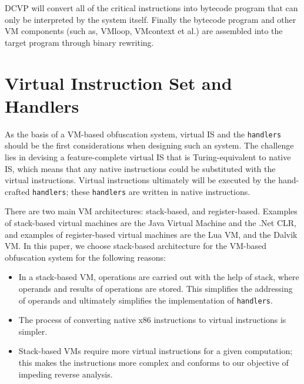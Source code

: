 DCVP will convert all of the critical instructions into bytecode program that can only be interpreted by the system itself. Finally the bytecode program and other VM components (such as, VMloop, VMcontext et al.) are assembled into the target program through binary rewriting.



\section{Virtual Instruction Set and Handlers}\label{sec:VIS-Handlers}
As the basis of a VM-based obfuscation system, virtual IS and the \texttt{handlers} should be the first considerations when designing such an system. The challenge lies in devising a feature-complete virtual IS that is Turing-equivalent to native IS, which means that any native instructions could be substituted with the virtual instructions. Virtual instructions ultimately will be executed by the hand-crafted \texttt{handlers}; these \texttt{handlers} are written in native instructions.

There are two main VM architectures: stack-based, and register-based. Examples of stack-based virtual machines are the Java Virtual Machine and the .Net CLR, and examples of register-based virtual machines are the Lua VM, and the Dalvik VM. In this paper, we choose stack-based architecture for the VM-based obfuscation system for the following reasons:
\begin{itemize}
  \item In a stack-based VM, operations are carried out with the help of stack, where operands and results of operations are stored. This simplifies the addressing of operands and ultimately simplifies the implementation of \texttt{handlers}.
  \item The process of converting native x86 instructions to virtual instructions is simpler.
  \item Stack-based VMs require more virtual instructions for a given computation; this makes the instructions more complex and conforms to our objective of impeding reverse analysis.
\end{itemize}

